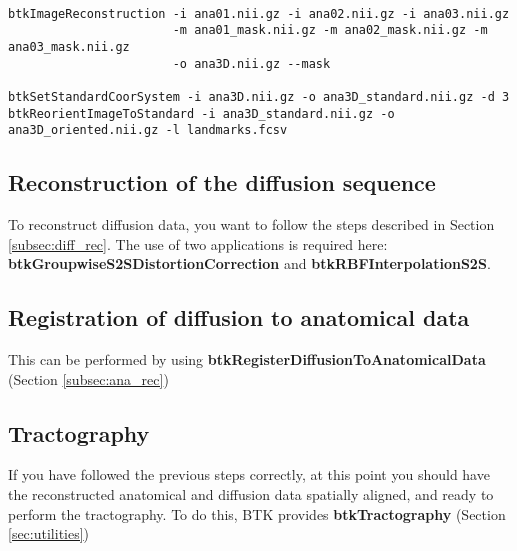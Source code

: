 \begin{verbatim}
 
btkImageReconstruction -i ana01.nii.gz -i ana02.nii.gz -i ana03.nii.gz 
                       -m ana01_mask.nii.gz -m ana02_mask.nii.gz -m ana03_mask.nii.gz
                       -o ana3D.nii.gz --mask

btkSetStandardCoorSystem -i ana3D.nii.gz -o ana3D_standard.nii.gz -d 3
btkReorientImageToStandard -i ana3D_standard.nii.gz -o ana3D_oriented.nii.gz -l landmarks.fcsv

\end{verbatim}



\subsection{Reconstruction of the diffusion sequence}
To reconstruct diffusion data, you want to follow the steps described in
Section \ref{subsec:diff_rec}. The use of two applications is required here:
\textbf{btkGroupwiseS2SDistortionCorrection} and
\textbf{btkRBFInterpolationS2S}.

\subsection{Registration of diffusion to anatomical data}
This can be performed by using \textbf{btkRegisterDiffusionToAnatomicalData}
(Section \ref{subsec:ana_rec})

\subsection{Tractography}
If you have followed the previous steps correctly, at this point you should
have the reconstructed anatomical and diffusion data spatially aligned, and
ready to perform the tractography. To do this, BTK provides
\textbf{btkTractography} (Section \ref{sec:utilities})
